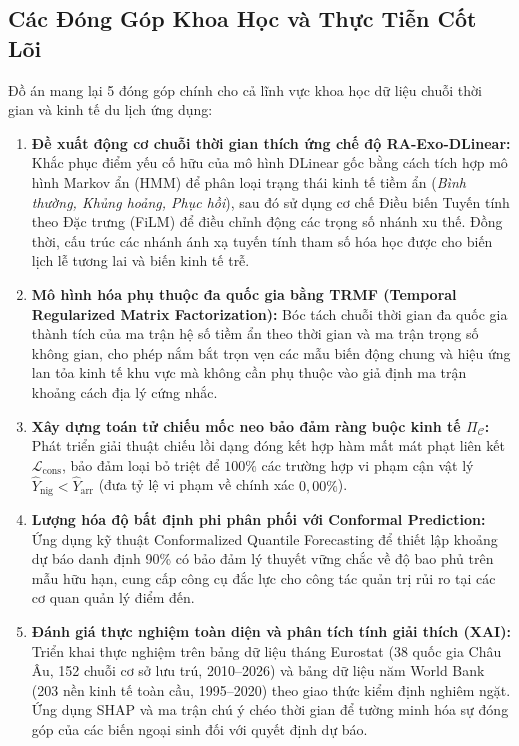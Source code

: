 \subsection{Các Đóng Góp Khoa Học và Thực Tiễn Cốt Lõi}
Đồ án mang lại 5 đóng góp chính cho cả lĩnh vực khoa học dữ liệu chuỗi thời gian và kinh tế du lịch ứng dụng:
\begin{enumerate}
    \item \textbf{Đề xuất động cơ chuỗi thời gian thích ứng chế độ RA-Exo-DLinear:} Khắc phục điểm yếu cố hữu của mô hình DLinear gốc bằng cách tích hợp mô hình Markov ẩn (HMM) để phân loại trạng thái kinh tế tiềm ẩn (\textit{Bình thường, Khủng hoảng, Phục hồi}), sau đó sử dụng cơ chế Điều biến Tuyến tính theo Đặc trưng (FiLM) để điều chỉnh động các trọng số nhánh xu thế. Đồng thời, cấu trúc các nhánh ánh xạ tuyến tính tham số hóa học được cho biến lịch lễ tương lai và biến kinh tế trễ.
    \item \textbf{Mô hình hóa phụ thuộc đa quốc gia bằng TRMF (Temporal Regularized Matrix Factorization):} Bóc tách chuỗi thời gian đa quốc gia thành tích của ma trận hệ số tiềm ẩn theo thời gian và ma trận trọng số không gian, cho phép nắm bắt trọn vẹn các mẫu biến động chung và hiệu ứng lan tỏa kinh tế khu vực mà không cần phụ thuộc vào giả định ma trận khoảng cách địa lý cứng nhắc.
    \item \textbf{Xây dựng toán tử chiếu mốc neo bảo đảm ràng buộc kinh tế $\Pi_{\mathcal{C}}$:} Phát triển giải thuật chiếu lồi dạng đóng kết hợp hàm mất mát phạt liên kết $\mathcal{L}_{\text{cons}}$, bảo đảm loại bỏ triệt để $100\%$ các trường hợp vi phạm cận vật lý $\hat{Y}_{\text{nig}} < \hat{Y}_{\text{arr}}$ (đưa tỷ lệ vi phạm về chính xác $0{,}00\%$).
    \item \textbf{Lượng hóa độ bất định phi phân phối với Conformal Prediction:} Ứng dụng kỹ thuật Conformalized Quantile Forecasting để thiết lập khoảng dự báo danh định 90\% có bảo đảm lý thuyết vững chắc về độ bao phủ trên mẫu hữu hạn, cung cấp công cụ đắc lực cho công tác quản trị rủi ro tại các cơ quan quản lý điểm đến.
    \item \textbf{Đánh giá thực nghiệm toàn diện và phân tích tính giải thích (XAI):} Triển khai thực nghiệm trên bảng dữ liệu tháng Eurostat (38 quốc gia Châu Âu, 152 chuỗi cơ sở lưu trú, 2010--2026) và bảng dữ liệu năm World Bank (203 nền kinh tế toàn cầu, 1995--2020) theo giao thức kiểm định nghiêm ngặt. Ứng dụng SHAP và ma trận chú ý chéo thời gian để tường minh hóa sự đóng góp của các biến ngoại sinh đối với quyết định dự báo.
\end{enumerate}

